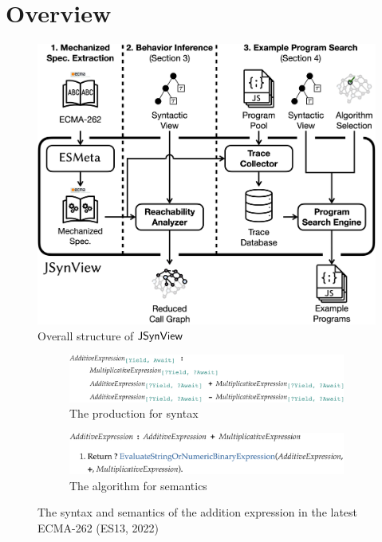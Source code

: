 \section{Overview}\label{sec:overview}

\begin{figure}
  \centering
  \includegraphics[width=\columnwidth]{img/overall.png}
  \caption{Overall structure of $\tool$}
  \label{fig:overall}
\end{figure}

\begin{figure}
  \centering
  \begin{subfigure}[t]{\columnwidth}
    \centering
    \includegraphics[width=\columnwidth]{img/add-eval-bnf.png}
    \caption{The  production for syntax}
  \end{subfigure}
  \begin{subfigure}[t]{\columnwidth}
    \centering
    \includegraphics[width=\columnwidth]{img/add-eval-algo.png}
    \caption{The  algorithm for semantics}
  \end{subfigure}
  \caption{The syntax and semantics of the addition expression in the latest
  ECMA-262 (ES13, 2022)}
  \label{fig:add-eval}
\end{figure}

